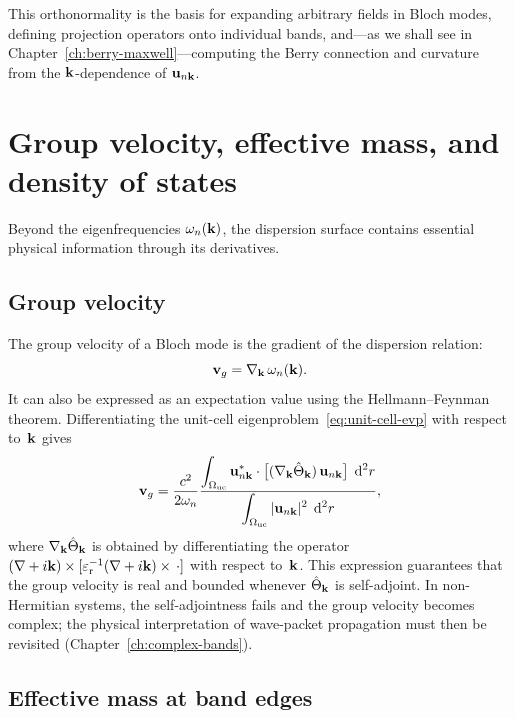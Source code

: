 This orthonormality is the basis for expanding arbitrary fields in Bloch
modes, defining projection operators onto individual bands, and---as we
shall see in Chapter~\ref{ch:berry-maxwell}---computing the Berry
connection and curvature from the $\mathbf{k}$-dependence of $\mathbf{u}_{n\mathbf{k}}$.


\section{Group velocity, effective mass, and density of states}
\label{sec:group-velocity-dos}

Beyond the eigenfrequencies $\omega_n(\mathbf{k})$, the dispersion surface
contains essential physical information through its derivatives.

\subsection{Group velocity}
\label{ssec:group-velocity}

The group velocity of a Bloch mode is the gradient of the dispersion
relation:
\begin{equation}
 \mathbf{v}_g = \nabla_{\mathbf{k}}\,\omega_n(\mathbf{k}).
 \label{eq:group-velocity}
\end{equation}
It can also be expressed as an expectation value using the
Hellmann--Feynman theorem. Differentiating the unit-cell
eigenproblem~\eqref{eq:unit-cell-evp} with respect to~$\mathbf{k}$ gives
\begin{equation}
 \mathbf{v}_g
 = \frac{c^2}{2\omega_n}
 \frac{\displaystyle
 \int_{\Omega_{\mathrm{uc}}}
 \mathbf{u}_{n\mathbf{k}}^*\cdot
 \bigl[
 (\nabla_{\mathbf{k}}\hat{\Theta}_{\mathbf{k}})\,\mathbf{u}_{n\mathbf{k}}
 \bigr]\;\mathop{}\!\mathrm{d}^2 r}
 {\displaystyle
 \int_{\Omega_{\mathrm{uc}}}
 |\mathbf{u}_{n\mathbf{k}}|^2\;\mathop{}\!\mathrm{d}^2 r},
 \label{eq:hellmann-feynman-vg}
\end{equation}
where $\nabla_{\mathbf{k}}\hat{\Theta}_{\mathbf{k}}$ is obtained by differentiating the
operator $(\nabla + i\mathbf{k})\times[\varepsilon_{\mathrm{r}}^{-1}(\nabla + i\mathbf{k})\times\,\cdot]$
with respect to~$\mathbf{k}$. This expression guarantees that the group velocity
is real and bounded whenever $\hat{\Theta}_{\mathbf{k}}$ is self-adjoint.
In non-Hermitian systems, the self-adjointness fails and the group velocity
becomes complex; the physical interpretation of wave-packet propagation
must then be revisited (Chapter~\ref{ch:complex-bands}).

\subsection{Effective mass at band edges}
\label{ssec:effective-mass}

